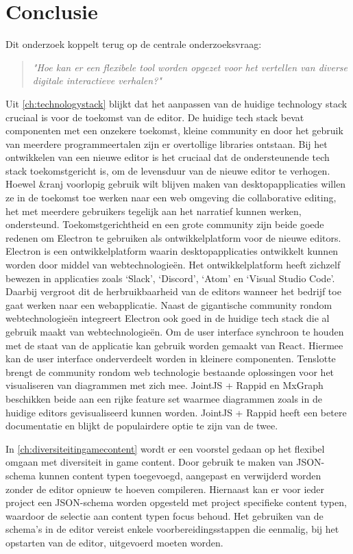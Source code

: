 \chapter{Conclusie}
\label{ch:conclusion}
Dit onderzoek koppelt terug op de centrale onderzoeksvraag: 
\begin{quote} 
    \centering
    \large
    \textit{
        "Hoe kan er een flexibele tool worden opgezet voor het vertellen van diverse digitale interactieve verhalen?"
    }
\end{quote}

Uit \autoref{ch:technologystack} blijkt dat het aanpassen van de huidige technology stack cruciaal is voor de toekomst van de editor. De huidige tech stack bevat componenten met een onzekere toekomst, kleine community en door het gebruik van meerdere programmeertalen zijn er overtollige libraries ontstaan. Bij het ontwikkelen van een nieuwe editor is het cruciaal dat de ondersteunende tech stack toekomstgericht is, om de levensduur van de nieuwe editor te verhogen. Hoewel \&ranj voorlopig gebruik wilt blijven maken van desktopapplicaties willen ze in de toekomst toe werken naar een web omgeving die collaborative editing, het met meerdere gebruikers tegelijk aan het narratief kunnen werken, ondersteund. Toekomstgerichtheid en een grote community zijn beide goede redenen om Electron te gebruiken als ontwikkelplatform voor de nieuwe editors. Electron is een ontwikkelplatform waarin desktopapplicaties ontwikkelt kunnen worden door middel van webtechnologieën. Het ontwikkelplatform heeft zichzelf bewezen in applicaties zoals ‘Slack’, ‘Discord’, ‘Atom’ en ‘Visual Studio Code’. Daarbij vergroot dit de herbruikbaarheid van de editors wanneer het bedrijf toe gaat werken naar een webapplicatie. Naast de gigantische community rondom webtechnologieën integreert Electron ook goed in de huidige tech stack die al gebruik maakt van webtechnologieën. Om de user interface synchroon te houden met de staat van de applicatie kan gebruik worden gemaakt van React. Hiermee kan de user interface onderverdeelt worden in kleinere componenten. Tenslotte brengt de community rondom web technologie bestaande oplossingen voor het visualiseren van diagrammen met zich mee. JointJS + Rappid en MxGraph beschikken beide aan een rijke feature set waarmee diagrammen zoals in de huidige editors gevisualiseerd kunnen worden. JointJS + Rappid heeft een betere documentatie en blijkt de populairdere optie te zijn van de twee. 

In \autoref{ch:diversiteitingamecontent} wordt er een voorstel gedaan op het flexibel omgaan met diversiteit in game content. Door gebruik te maken van JSON-schema kunnen content typen toegevoegd, aangepast en verwijderd worden zonder de editor opnieuw te hoeven compileren. Hiernaast kan er voor ieder project een JSON-schema worden opgesteld met project specifieke content typen, waardoor de selectie aan content typen focus behoud. Het gebruiken van de schema’s in de editor vereist enkele voorbereidingsstappen die eenmalig, bij het opstarten van de editor, uitgevoerd moeten worden.

